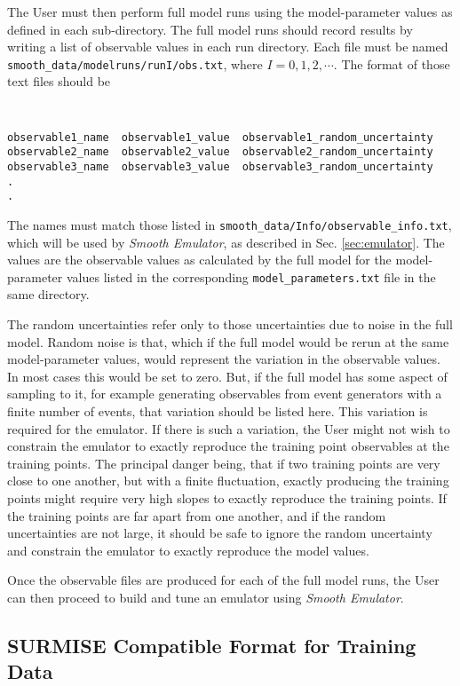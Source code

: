 \documentclass[UserManual.tex]{subfiles}
\begin{document}
The User must then perform full model runs using the model-parameter values as defined in each sub-directory. The full model runs should record results by writing a list of observable values in each run directory. Each file must be named {\tt smooth\_data/modelruns/runI/obs.txt}, where $I=0,1,2,\cdots$. The format of those text files should be
{\tt
\begin{verbatim}
observable1_name  observable1_value  observable1_random_uncertainty
observable2_name  observable2_value  observable2_random_uncertainty
observable3_name  observable3_value  observable3_random_uncertainty
.
.
\end{verbatim}
}
The names must match those listed in {\tt smooth\_data/Info/observable\_info.txt}, which will be used by {\it Smooth Emulator}, as described in Sec. \ref{sec:emulator}. The values are the observable values as calculated by the full model for the model-parameter values listed in the corresponding {\tt model\_parameters.txt} file in the same directory.

The random uncertainties refer only to those uncertainties due to noise in the full model. Random noise is that, which if the full model would be rerun at the same model-parameter values, would represent the variation in the observable values. In most cases this would be set to zero. But, if the full model has some aspect of sampling to it, for example generating observables from event generators with a finite number of events, that variation should be listed here. This variation is required for the emulator. If there is such a variation, the User might not wish to constrain the emulator to exactly reproduce the training point observables at the training points. The principal danger being, that if two training points are very close to one another, but with a finite fluctuation, exactly producing the training points might require very high slopes to exactly reproduce the training points. If the training points are far apart from one another, and if the random uncertainties are not large, it should be safe to ignore the random uncertainty and constrain the emulator to exactly reproduce the model values. 

Once the observable files are produced for each of the full model runs, the User can then proceed to build and tune an emulator using {\it Smooth Emulator}.

\subsection{SURMISE Compatible Format for Training Data}
\end{document}
